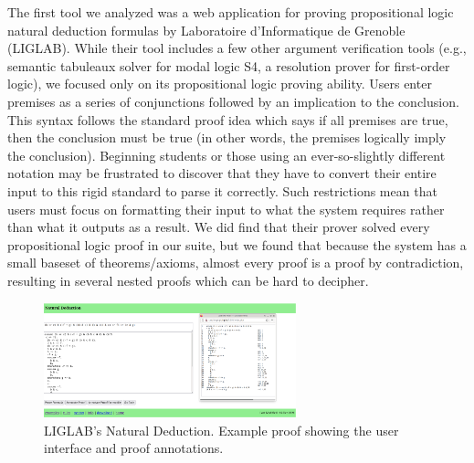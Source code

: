 \documentclass[ms]{uncgdissertationexp2}
\theoremstyle{plain}
\theoremstyle{definition}
\theoremstyle{remark}
\newcommand{\titlecaption}[2]{\caption[#1]{#1. #2}}
\begin{document}
The first tool we analyzed was a web application for proving propositional logic natural deduction formulas by Laboratoire d'Informatique de Grenoble (LIGLAB). While their tool includes a few other argument verification tools (e.g., semantic tabuleaux solver for modal logic S4, a resolution prover for first-order logic), we focused only on its propositional logic proving ability. Users enter premises as a series of conjunctions followed by an implication to the conclusion. This syntax follows the standard proof idea which says if all premises are true, then the conclusion must be true (in other words, the premises logically imply the conclusion). Beginning students or those using an ever-so-slightly different notation may be frustrated to discover that they have to convert their entire input to this rigid standard to parse it correctly. Such restrictions mean that users must focus on formatting their input to what the system requires rather than what it outputs as a result. We did find that their prover solved every propositional logic proof in our suite, but we found that because the system has a small baseset of theorems/axioms, almost every proof is a proof by contradiction, resulting in several nested proofs which can be hard to decipher.
\begin{figure}[!ht]
	\centering
	\includegraphics[width=0.65\textwidth]{teachinglogic.png}
	\titlecaption{LIGLAB's Natural Deduction}{Example proof showing the user interface and proof annotations.}
	\label{fig:liglab}
\end{figure} 
\end{document}
